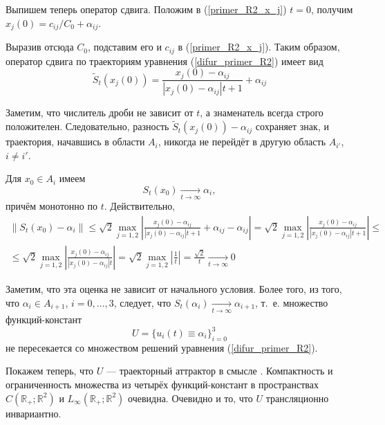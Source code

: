 Выпишем теперь оператор сдвига.
Положим в (\ref{primer_R2_x_j}) $t=0$, получим
$
	x_j(0) = c_{ij}/{C_0}+\alpha_{ij}
$.

Выразив отсюда $C_0$, подставим его и $c_{ij}$ в (\ref{primer_R2_x_j}).
Таким образом, оператор сдвига по траекториям уравнения (\ref{difur_primer_R2}) имеет вид
\begin{equation}\label{primer_R2_oper_sdviga}
	\tilde{S}_t(x_{j}(0)) = \frac{x_{j}(0)-\alpha_{ij}}{|x_{j}(0)-\alpha_{ij}|t+1}+\alpha_{ij}
\end{equation}

Заметим, что числитель дроби не зависит от $t$, а знаменатель всегда строго положителен.
Следовательно, разность $\tilde{S}_t(x_j(0)) - \alpha_{ij}$ сохраняет знак,
и траектория, начавшись в области $A_i$, никогда не перейдёт в другую область $A_{i'}$, $i \neq i'$.

Для $x_0 \in A_i$ имеем
\begin{equation}\label{primer_R2_stremlenie}
	S_t(x_0) \xrightarrow[t \to \infty]{} \alpha_{i},
\end{equation}
причём монотонно по $t$.
Действительно,
\begin{multline}
	\|S_t(x_0) - \alpha_i\| \leq
	\sqrt{2} \max_{j=1,2} \left| \frac{x_{j}(0)-\alpha_{ij}}{|x_{j}(0)-\alpha_{ij}|t+1} + \alpha_{ij} - \alpha_{ij}  \right| =
	\sqrt{2} \max_{j=1,2} \left| \frac{x_{j}(0)-\alpha_{ij}}{|x_{j}(0)-\alpha_{ij}|t+1} \right| \leq
	\\ \leq
	\sqrt{2} \max_{j=1,2} \left| \frac{x_{j}(0)-\alpha_{ij}}{|x_{j}(0)-\alpha_{ij}|t} \right| =
	\sqrt{2} \max_{j=1,2} \left| \frac{1}{t} \right| =
	\frac{\sqrt{2}}{t} \xrightarrow[t \to \infty]{} 0
\end{multline}

Заметим, что эта оценка не зависит от начального условия.
Более того, из того, что $\alpha_i \in A_{i+1}$, $i=0,...,3$,
следует, что $S_t(\alpha_i) \xrightarrow[t \to \infty]{} \alpha_{i+1}$,
т.~е. множество функций-констант
$$
	U = \{ u_i(t) \equiv \alpha_i \}_{i=0}^{3}
$$
не пересекается со множеством решений уравнения (\ref{difur_primer_R2}).

Покажем теперь, что $U$ --- траекторный аттрактор в смысле \cite{Kondratyev}.
Компактность и ограниченность множества из четырёх функций-констант в пространствах
$C(\mathbb{R}_+; \mathbb{R}^2)$ и $L_\infty(\mathbb{R}_+; \mathbb{R}^2)$ очевидна.
Очевидно и то, что $U$ трансляционно инвариантно.

